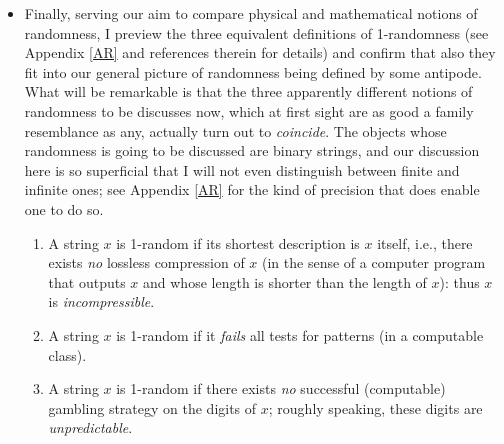 \documentclass[11pt,a4paper]{article}
\numberwithin{equation}{section}
\begin{document}
\begin{itemize}
  \item Finally, serving our aim to compare physical and mathematical notions of randomness, I preview the three equivalent definitions of 1-randomness (see Appendix \ref{AR} and references therein  for details) and confirm that also they  fit into our general picture of randomness being defined by some antipode. What will be remarkable is that the three apparently  different notions of randomness to be discusses now, which at first sight are as good a family resemblance as any, actually turn out to \emph{coincide}. The objects whose randomness is going to be discussed are  binary strings, and our discussion here is so superficial that I will not even distinguish between finite and infinite ones; see Appendix \ref{AR} for the kind of precision that does enable one to do so. 
  \begin{enumerate}
\item A string $x$ is 1-random if its shortest description is $x$ itself, i.e.,  there exists \emph{no} lossless compression of $x$ (in the sense of a computer program that outputs $x$ and whose length is shorter than the length of $x$): thus $x$ is \emph{incompressible}.
\item A string $x$ is 1-random if it \emph{fails} all tests for patterns (in a computable  class).
\item A string $x$ is 1-random if there exists \emph{no} successful (computable)  gambling strategy on the digits of $x$; 
roughly speaking, these digits are \emph{unpredictable}.
\end{enumerate}
  \end{itemize}
\end{document}
